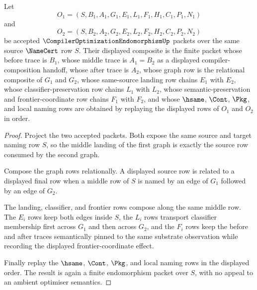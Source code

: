\begin{theorem}
\label{thm:compiler-optimization-endomorphism-composition}
Let
$$
O_1=(S,B_1,A_1,G_1,E_1,L_1,F_1,H_1,C_1,P_1,N_1)
$$
and
$$
O_2=(S,B_2,A_2,G_2,E_2,L_2,F_2,H_2,C_2,P_2,N_2)
$$
be accepted $\CompilerOptimizationEndomorphismUp$ packets over the same source $\NameCert$ row $S$. Their displayed composite is the finite packet whose before trace is $B_1$, whose middle trace is $A_1=B_2$ as a displayed compiler-composition handoff, whose after trace is $A_2$, whose graph row is the relational composite of $G_1$ and $G_2$, whose same-source landing row chains $E_1$ with $E_2$, whose classifier-preservation row chains $L_1$ with $L_2$, whose semantic-preservation and frontier-coordinate row chains $F_1$ with $F_2$, and whose $\hsame$, $\Cont$, $\Pkg$, and local naming rows are obtained by replaying the displayed rows of $O_1$ and $O_2$ in order.
\end{theorem}
\begin{proof}
Project the two accepted packets. Both expose the same source and target naming row $S$, so the middle landing of the first graph is exactly the source row consumed by the second graph.

Compose the graph rows relationally. A displayed source row is related to a displayed final row when a middle row of $S$ is named by an edge of $G_1$ followed by an edge of $G_2$.

The landing, classifier, and frontier rows compose along the same middle row. The $E_i$ rows keep both edges inside $S$, the $L_i$ rows transport classifier membership first across $G_1$ and then across $G_2$, and the $F_i$ rows keep the before and after traces semantically pinned to the same substrate observation while recording the displayed frontier-coordinate effect.

Finally replay the $\hsame$, $\Cont$, $\Pkg$, and local naming rows in the displayed order. The result is again a finite endomorphism packet over $S$, with no appeal to an ambient optimiser semantics.
\end{proof}

